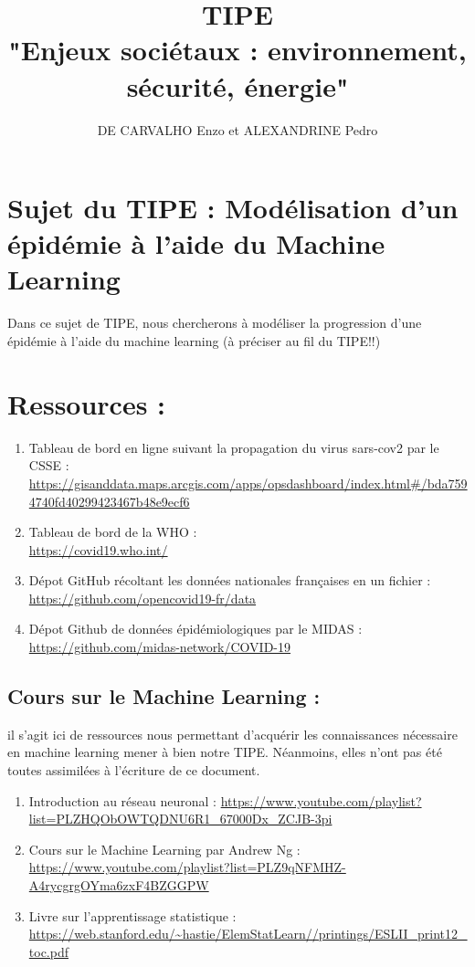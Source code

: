\documentclass[a4paper,11pt]{article}
\title{TIPE \\ \small{"Enjeux sociétaux : environnement, sécurité, énergie"}}
\author{DE CARVALHO Enzo et ALEXANDRINE Pedro}
\date{}
\begin{document}
\maketitle
\section*{Sujet du TIPE : Modélisation d'un épidémie à l'aide du Machine Learning}
Dans ce sujet de TIPE, nous chercherons à modéliser la progression d'une épidémie à l'aide du machine learning (à préciser au fil du TIPE!!)

\section*{Ressources :}
\begin{enumerate}
\item Tableau de bord en ligne suivant la propagation du virus sars-cov2 par le CSSE :\\
\url{https://gisanddata.maps.arcgis.com/apps/opsdashboard/index.html#/bda7594740fd40299423467b48e9ecf6}

\item Tableau de bord de la WHO :\\
\url{https://covid19.who.int/}

\item Dépot GitHub récoltant les données nationales françaises en un fichier :\\
\url{https://github.com/opencovid19-fr/data}

\item Dépot Github de données épidémiologiques par le MIDAS :\\ 
\url{https://github.com/midas-network/COVID-19} 
\end{enumerate}

\subsection*{Cours sur le Machine Learning :}

\small{il s'agit ici de ressources nous permettant d'acquérir les connaissances nécessaire en machine learning mener à bien notre TIPE. Néanmoins, elles n'ont pas été toutes assimilées à l'écriture de ce document.}\\
\begin{enumerate}
\item Introduction au réseau neuronal :
\url{https://www.youtube.com/playlist?list=PLZHQObOWTQDNU6R1_67000Dx_ZCJB-3pi}

\item Cours sur le Machine Learning par Andrew Ng :\\
\url{https://www.youtube.com/playlist?list=PLZ9qNFMHZ-A4rycgrgOYma6zxF4BZGGPW}

\item Livre sur l'apprentissage statistique :\\
\url{https://web.stanford.edu/~hastie/ElemStatLearn//printings/ESLII_print12_toc.pdf}
\end{enumerate}
\end{document}
